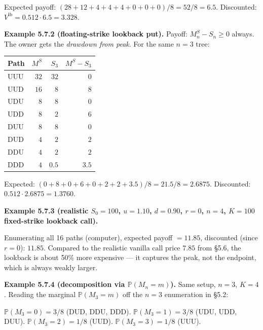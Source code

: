 \documentclass[
  10pt,
  twoside]{book}
\newcounter{none} %
\begin{document}
Expected payoff: \((28 + 12 + 4 + 4 + 4 + 0 + 0 + 0)/8 = 52/8 = 6.5\).
Discounted: \(V^{\text{lb}} = 0.512 \cdot 6.5 = \mathbf{3.328}\).

\textbf{Example 5.7.2 (floating-strike lookback put).} Payoff:
\(M^S_n - S_n \ge 0\) always. The owner gets the \emph{drawdown from
peak}. For the same \(n = 3\) tree:

{\def\LTcaptype{none} %
\begin{table}[H]
\centering
\begin{tabular}{|l|r|r|r|}
\toprule
Path & \(M^S\) & \(S_3\) & \(M^S - S_3\) \\
\midrule



UUU & \(32\) & \(32\) & \(0\) \\
UUD & \(16\) & \(8\) & \(8\) \\
UDU & \(8\) & \(8\) & \(0\) \\
UDD & \(8\) & \(2\) & \(6\) \\
DUU & \(8\) & \(8\) & \(0\) \\
DUD & \(4\) & \(2\) & \(2\) \\
DDU & \(4\) & \(2\) & \(2\) \\
DDD & \(4\) & \(0.5\) & \(3.5\) \\
\bottomrule
\end{tabular}
\end{table}
}

Expected: \((0 + 8 + 0 + 6 + 0 + 2 + 2 + 3.5)/8 = 21.5/8 = 2.6875\).
Discounted: \(0.512 \cdot 2.6875 = \mathbf{1.3760}\).

\textbf{Example 5.7.3 (realistic \(S_0 = 100\), \(u = 1.10\),
\(d = 0.90\), \(r = 0\), \(n = 4\), \(K = 100\) fixed-strike lookback
call).}

Enumerating all 16 paths (computer), expected payoff \(= 11.85\),
discounted (since \(r=0\)): \(\mathbf{11.85}\). Compared to the
realistic vanilla call price \(7.85\) from §5.6, the lookback is about
50\% more expensive --- it captures the peak, not the endpoint, which is
always weakly larger.

\textbf{Example 5.7.4 (decomposition via \(\mathbb P(M_n = m)\)).} Same
setup, \(n = 3\), \(K = 4\). Reading the marginal \(\mathbb P(M_3 = m)\)
off the \(n=3\) enumeration in §5.2:

\(\mathbb P(M_3 = 0) = 3/8\) (DUD, DDU, DDD).
\(\mathbb P(M_3 = 1) = 3/8\) (UDU, UDD, DUU).
\(\mathbb P(M_3 = 2) = 1/8\) (UUD). \(\mathbb P(M_3 = 3) = 1/8\) (UUU).
\end{document}

